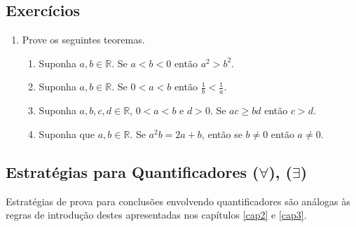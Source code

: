\subsection{Exercícios}

\begin{enumerate}
  \item Prove os seguintes teoremas.
  \begin{enumerate}
      \item Suponha $a,b\in\mathbb{R}$. Se $a < b < 0$ então $a^2 >
        b^2$.
      \item Suponha $a,b\in\mathbb{R}$. Se $0 < a < b$ então
        $\frac{1}{b}<\frac{1}{a}$.
     \item Suponha $a,b,c,d\in\mathbb{R}$, $0 < a < b$ e $d > 0$. Se
       $ac \geq bd$ então $c > d$.
     \item Suponha que $a,b\in\mathbb{R}$. Se $a^2b = 2a + b$, então
       se $b\neq 0$ então $a \neq 0$.
  \end{enumerate}
\end{enumerate}

\subsection{Estratégias para Quantificadores ($\forall$), ($\exists$)}

Estratégias de prova para conclusões envolvendo quantificadores são
análogas às regras de introdução destes apresentadas nos capítulos
\ref{cap2} e \ref{cap3}.


